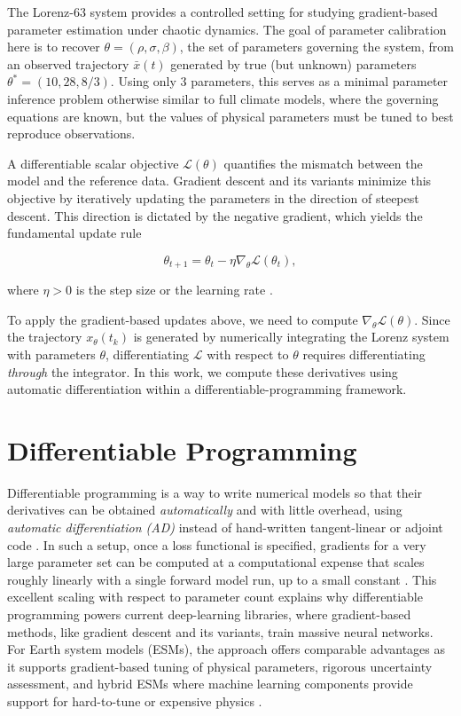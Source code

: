 The Lorenz-63 system provides a controlled setting for studying gradient-based parameter estimation under chaotic dynamics. The goal of parameter calibration here is to recover $\theta = (\rho, \sigma, \beta)$, the set of parameters governing the system, from an observed trajectory $\bar{x}(t)$ generated by true (but unknown) parameters $\theta^* = (10,28,8/3)$. Using only 3 parameters, this serves as a minimal parameter inference problem otherwise similar to full climate models, where the governing equations are known, but the values of physical parameters must be tuned to best reproduce observations.

A differentiable scalar objective $\mathcal{L}(\theta)$ quantifies the mismatch between the model and the reference data. Gradient descent and its variants minimize this objective by iteratively updating the parameters in the direction of steepest descent. This direction is dictated by the negative gradient, which yields the fundamental update rule

\begin{equation}
    \theta_{t+1} = \theta_t - \eta \nabla_\theta \mathcal{L}(\theta_t),
\end{equation}

where $\eta>0$ is the step size or the learning rate \parencite{blondel_elements_2024}.

To apply the gradient-based updates above, we need to compute $\nabla_\theta \mathcal{L}(\theta)$. Since the trajectory $x_\theta(t_k)$ is generated by numerically integrating the Lorenz system with parameters $\theta$, differentiating $\mathcal{L}$ with respect to $\theta$ requires differentiating \emph{through} the integrator. In this work, we compute these derivatives using automatic differentiation within a differentiable-programming framework.

\section{Differentiable Programming}
\label{sec:diff_prog}

Differentiable programming is a way to write numerical models so that their derivatives can be obtained \emph{automatically} and with little overhead, using \emph{automatic differentiation (AD)} instead of hand-written tangent-linear or adjoint code \parencite{baydin_automatic_2015}. In such a setup, once a loss functional is specified, gradients for a very large parameter set can be computed at a computational expense that scales roughly linearly with a single forward model run, up to a small constant \parencite{baydin_automatic_2015,blondel_elements_2024}. This excellent scaling with respect to parameter count explains why differentiable programming powers current deep-learning libraries, where gradient-based methods, like gradient descent and its variants, train massive neural networks. For Earth system models (ESMs), the approach offers comparable advantages as it supports gradient-based tuning of physical parameters, rigorous uncertainty assessment, and hybrid ESMs where machine learning components provide support for hard-to-tune or expensive physics \parencite{gelbrecht_differentiable_2023}.

